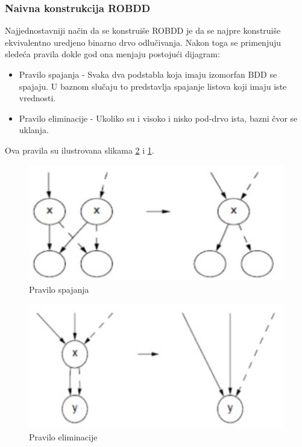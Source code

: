 \subsubsection{Naivna konstrukcija ROBDD}
\label{subsubsec:naiveROBDDConstruction}

Najjednostavniji na\v{c}in da se konstrui\v{s}e ROBDD je da se najpre konstrui\v{s}e ekvivalentno uredjeno binarno drvo odlu\v{c}ivanja. Nakon toga se primenjuju slede\'c{}a pravila dokle god ona menjaju postoju\'c{}i dijagram:
\begin{itemize}
    \item Pravilo spajanja - Svaka dva podstabla koja imaju izomorfan BDD se spajaju. U baznom slu\v{c}aju to predstavlja spajanje listova koji imaju iste vrednosti.
    \item Pravilo eliminacije - Ukoliko su i visoko i nisko pod-drvo ista, bazni \v{c}vor se uklanja.
\end{itemize}
Ova pravila su ilustrovana slikama \ref{fig:eliminationRule} i \ref{fig:reductionRule}.

\begin{figure}[H]
    \centering
    \includegraphics[scale=0.35]{slike/pravilo_spajanja.PNG}
    \caption{Pravilo spajanja}
    \label{fig:reductionRule}
\end{figure}

\begin{figure}[H]
    \centering
    \includegraphics[scale=0.35]{slike/pravilo_eliminacije.PNG}
    \caption{Pravilo eliminacije}
    \label{fig:eliminationRule}
\end{figure}

